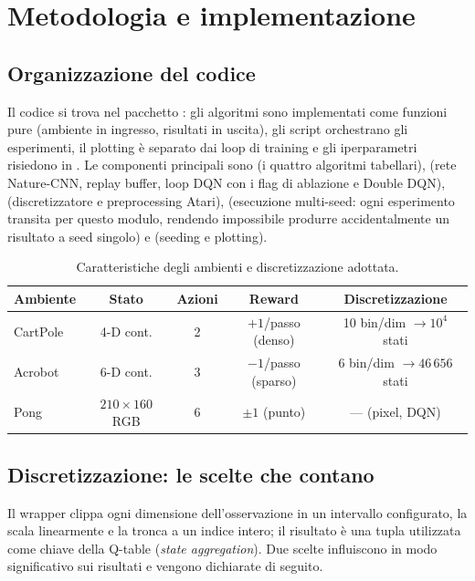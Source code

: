 \section{Metodologia e implementazione}
\label{sec:methodology}

\subsection{Organizzazione del codice}
Il codice si trova nel pacchetto : gli algoritmi sono implementati come
funzioni pure (ambiente in ingresso, risultati in uscita), gli script orchestrano gli
esperimenti, il plotting \`e separato dai loop di training e gli iperparametri risiedono
in . Le componenti principali sono  (i
quattro algoritmi tabellari),  (rete Nature-CNN, replay buffer,
loop DQN con i flag di ablazione e Double DQN),  (discretizzatore e
preprocessing Atari),  (esecuzione multi-seed: ogni
esperimento transita per questo modulo, rendendo impossibile produrre accidentalmente
un risultato a seed singolo) e  (seeding e plotting).

\begin{table}[H]
\centering
\caption{Caratteristiche degli ambienti e discretizzazione adottata.}
\label{tab:envs}
\begin{tabular}{lcccc}
\toprule
Ambiente & Stato & Azioni & Reward & Discretizzazione \\
\midrule
CartPole & 4-D cont. & 2 & $+1$/passo (denso) & 10 bin/dim $\to 10^4$ stati \\
Acrobot  & 6-D cont. & 3 & $-1$/passo (sparso) & 6 bin/dim $\to 46\,656$ stati \\
Pong     & $210{\times}160$ RGB & 6 & $\pm 1$ (punto) & --- (pixel, DQN) \\
\bottomrule
\end{tabular}
\end{table}

\subsection{Discretizzazione: le scelte che contano}
Il wrapper  clippa ogni dimensione dell'osservazione in un
intervallo configurato, la scala linearmente e la tronca a un indice intero; il
risultato \`e una tupla utilizzata come chiave della Q-table (\emph{state aggregation}).
Due scelte influiscono in modo significativo sui risultati e vengono dichiarate di
seguito.

